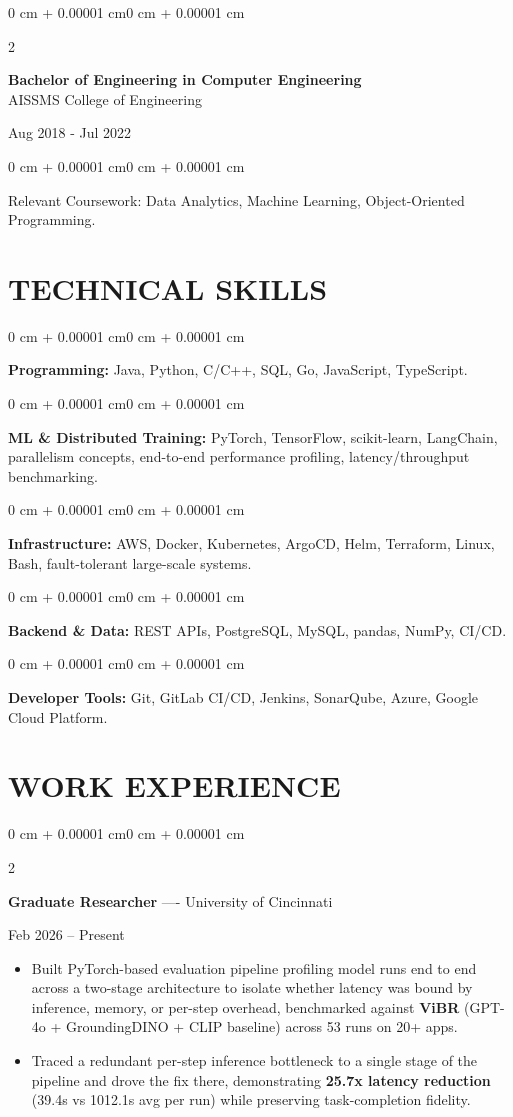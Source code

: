 \documentclass[10pt, letterpaper]{article}
\newenvironment{highlights}{
    \begin{itemize}[
        topsep=0.10 cm,
        parsep=0.06 cm,
        partopsep=0pt,
        itemsep=0.06 cm,
        leftmargin=12pt
    ]
}{
    \end{itemize}
}
\newenvironment{onecolentry}{
    \begin{adjustwidth}{0 cm + 0.00001 cm}{0 cm + 0.00001 cm}
}{
    \end{adjustwidth}
}
\newenvironment{twocolentry}[2][]{
    \onecolentry
    \def\secondColumn{#2}
    \setcolumnwidth{\fill, 4.5 cm}
    \begin{paracol}{2}
}{
    \switchcolumn \raggedleft \secondColumn
    \end{paracol}
    \endonecolentry
}
\begin{document}
\begin{twocolentry}{
    Aug 2018 - Jul 2022
}
    \textbf{Bachelor of Engineering in Computer Engineering} \\
    AISSMS College of Engineering
\end{twocolentry}
\begin{onecolentry}
Relevant Coursework: Data Analytics, Machine Learning, Object-Oriented Programming.
\end{onecolentry}
\section{TECHNICAL SKILLS}
\begin{onecolentry}
\textbf{Programming:} Java, Python, C/C++, SQL, Go, JavaScript, TypeScript.
\end{onecolentry}
\vspace{0.06 cm}
\begin{onecolentry}
\textbf{ML \& Distributed Training:} PyTorch, TensorFlow, scikit-learn, LangChain, parallelism concepts, end-to-end performance profiling, latency/throughput benchmarking.
\end{onecolentry}
\vspace{0.06 cm}
\begin{onecolentry}
\textbf{Infrastructure:} AWS, Docker, Kubernetes, ArgoCD, Helm, Terraform, Linux, Bash, fault-tolerant large-scale systems.
\end{onecolentry}
\vspace{0.06 cm}
\begin{onecolentry}
\textbf{Backend \& Data:} REST APIs, PostgreSQL, MySQL, pandas, NumPy, CI/CD.
\end{onecolentry}
\vspace{0.06 cm}
\begin{onecolentry}
\textbf{Developer Tools:} Git, GitLab CI/CD, Jenkins, SonarQube, Azure, Google Cloud Platform.
\end{onecolentry}

\section{WORK EXPERIENCE}
\begin{twocolentry}{Feb 2026 -- Present}
\textbf{Graduate Researcher} ---- University of Cincinnati
\end{twocolentry}
\begin{highlights}
  \item Built PyTorch-based evaluation pipeline profiling model runs end to end across a two-stage architecture to isolate whether latency was bound by inference, memory, or per-step overhead, benchmarked against \textbf{ViBR} (GPT-4o + GroundingDINO + CLIP baseline) across 53 runs on 20+ apps.
  \item Traced a redundant per-step inference bottleneck to a single stage of the pipeline and drove the fix there, demonstrating \textbf{25.7x latency reduction} (39.4s vs 1012.1s avg per run) while preserving task-completion fidelity.
\end{highlights}
\end{document}
